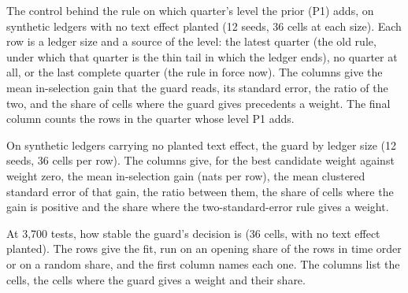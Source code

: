 \begin{table}[tp]\centering\scriptsize
\caption{The control behind the rule on which quarter's level the prior (P1) adds, on synthetic ledgers with no text effect planted (12 seeds, 36 cells at each size). Each row is a ledger size and a source of the level: the latest quarter (the old rule, under which that quarter is the thin tail in which the ledger ends), no quarter at all, or the last complete quarter (the rule in force now). The columns give the mean in-selection gain that the guard reads, its standard error, the ratio of the two, and the share of cells where the guard gives precedents a weight. The final column counts the rows in the quarter whose level P1 adds.}
\label{tab:guard-period-control}
\resizebox{\columnwidth}{!}{}
\end{table}

\begin{table}[tp]\centering\scriptsize
\caption{On synthetic ledgers carrying no planted text effect, the guard by ledger size (12 seeds, 36 cells per row). The columns give, for the best candidate weight against weight zero, the mean in-selection gain (nats per row), the mean clustered standard error of that gain, the ratio between them, the share of cells where the gain is positive and the share where the two-standard-error rule gives a weight.}
\label{tab:guard-gain-diagnostic}
\resizebox{\columnwidth}{!}{}
\end{table}

\begin{table}[tp]\centering\scriptsize
\caption{At 3,700 tests, how stable the guard's decision is (36 cells, with no text effect planted). The rows give the fit, run on an opening share of the rows in time order or on a random share, and the first column names each one. The columns list the cells, the cells where the guard gives a weight and their share.}
\label{tab:guard-fit-fraction}
\resizebox{0.8\columnwidth}{!}{}
\end{table}

